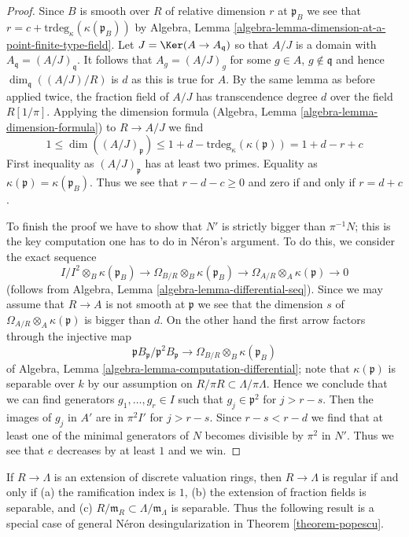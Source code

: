 \begin{proof}
\medskip\noindent
Since $B$ is smooth over $R$ of relative dimension $r$ at $\mathfrak p_B$
we see that $r = c + \text{trdeg}_\kappa(\kappa(\mathfrak p_B))$ by
Algebra, Lemma \ref{algebra-lemma-dimension-at-a-point-finite-type-field}.
Let $J = \Ker(A \to A_\mathfrak q)$ so that $A/J$ is a domain
with $A_\mathfrak q = (A/J)_\mathfrak q$. It follows that
$A_g = (A/J)_g$ for some $g \in A$, $g \not \in \mathfrak q$
and hence $\dim_\mathfrak q((A/J)/R)$ is $d$ as this is true for $A$.
By the same lemma as before applied twice, the fraction field of $A/J$
has transcendence degree $d$ over the field $R[1/\pi]$.
Applying the dimension formula
(Algebra, Lemma \ref{algebra-lemma-dimension-formula})
to $R \to A/J$ we find
$$
1 \leq \dim((A/J)_\mathfrak p) \leq 1 + d -
\text{trdeg}_\kappa(\kappa(\mathfrak p)) = 1 + d - r + c
$$
First inequality as $(A/J)_\mathfrak p$ has at least two primes.
Equality as $\kappa(\mathfrak p) = \kappa(\mathfrak p_B)$.
Thus we see that $r - d - c \geq 0$ and zero if and only if $r = d + c$.

\medskip\noindent
To finish the proof we have to show that $N'$ is strictly bigger
than $\pi^{-1}N$; this is the key computation one has to do
in N\'eron's argument. To do this, we consider the exact sequence
$$
I/I^2 \otimes_B \kappa(\mathfrak p_B)
\to \Omega_{B/R} \otimes_B \kappa(\mathfrak p_B)
\to \Omega_{A/R} \otimes_A \kappa(\mathfrak p) \to 0
$$
(follows from Algebra, Lemma \ref{algebra-lemma-differential-seq}).
Since we may assume that $R \to A$ is not
smooth at $\mathfrak p$ we see that the dimension $s$ of
$\Omega_{A/R} \otimes_A \kappa(\mathfrak p)$
is bigger than $d$. On the other hand
the first arrow factors through the injective map
$$
\mathfrak p B_\mathfrak p/\mathfrak p^2 B_\mathfrak p
\to \Omega_{B/R} \otimes_B \kappa(\mathfrak p_B)
$$
of Algebra, Lemma \ref{algebra-lemma-computation-differential};
note that $\kappa(\mathfrak p)$ is separable over $k$
by our assumption on $R/\pi R \subset \Lambda/\pi \Lambda$.
Hence we conclude that we can find generators
$g_1, \ldots, g_r \in I$ such that $g_j \in \mathfrak p^2$
for $j > r - s$. Then the images of $g_j$ in $A'$ are in $\pi^2 I'$
for $j > r - s$. Since $r - s < r - d$
we find that at least one of the minimal generators
of $N$ becomes divisible by $\pi^2$ in $N'$.
Thus we see that $e$ decreases by at least $1$ and we win.
\end{proof}

\noindent
If $R \to \Lambda$ is an extension of discrete valuation rings,
then $R \to \Lambda$ is regular if and only if
(a) the ramification index is $1$,
(b) the extension of fraction fields is separable, and
(c) $R/\mathfrak m_R \subset \Lambda/\mathfrak m_\Lambda$
is separable. Thus the following result is a special case
of general N\'eron desingularization in
Theorem \ref{theorem-popescu}.

